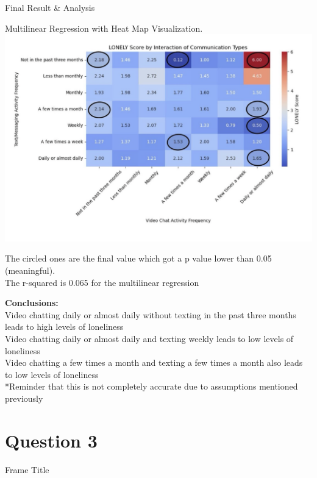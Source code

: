 \documentclass{beamer}
\begin{document}
\begin{frame}{Final Result & Analysis}


Multilinear Regression with Heat Map Visualization.\\
\includegraphics[width=0.5\linewidth]{image4.png}


The circled ones are the final value which got a p value lower than 0.05 (meaningful).\\
The r-squared is 0.065 for the multilinear regression\\
\end{frame}

\begin{frame}
\textbf{Conclusions:}\\
Video chatting daily or almost daily without texting in the past three months leads to high levels of loneliness\\
Video chatting daily or almost daily and texting weekly leads to low levels of loneliness\\
Video chatting a few times a month and texting a few times a month also leads to low levels of loneliness\\

*Reminder that this is not completely accurate due to assumptions mentioned previously\\
\end{frame}

\section{Question 3}
\begin{frame}{Frame Title}
    
\end{frame}
\end{document}
